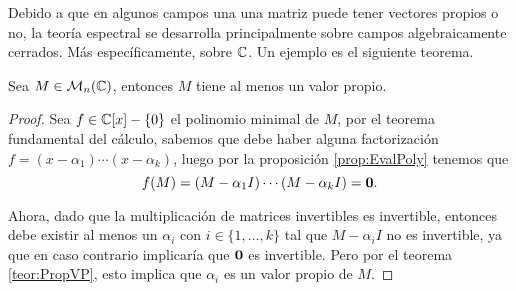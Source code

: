 Debido a que en algunos campos una una matriz puede tener vectores propios o no, la teoría espectral se desarrolla principalmente sobre campos algebraicamente cerrados. Más específicamente, sobre $\mathbb{C}$. Un ejemplo es el siguiente teorema.

\begin{prop}\label{prop:MComplexHasEV}
  Sea $M \in  \mathcal{M}_n(\mathbb{C})$, entonces $M$ tiene al menos un valor propio.
\end{prop}
\begin{proof}
  Sea $f \in \mathbb{C}[x]-\{0\}$ el polinomio minimal de $M$, por el teorema fundamental del cálculo, sabemos que debe haber alguna factorización $f = (x-\alpha_1)\cdots(x-\alpha_k)$, luego por la proposición \ref{prop:EvalPoly} tenemos que
  \[ f(M) = (M-\alpha_1 I)\cdots(M-\alpha_k I) = \mathbf{0}.\]

  Ahora, dado que la multiplicación de matrices invertibles es invertible, entonces debe existir al menos un $\alpha_i$ con $i \in \{1,\ldots,k\}$ tal que $M-\alpha_i I$ no es invertible, ya que en caso contrario implicaría que $\mathbf{0}$ es invertible. Pero por el teorema \ref{teor:PropVP}, esto implica que $\alpha_i$ es un valor propio de $M$.
\end{proof}

